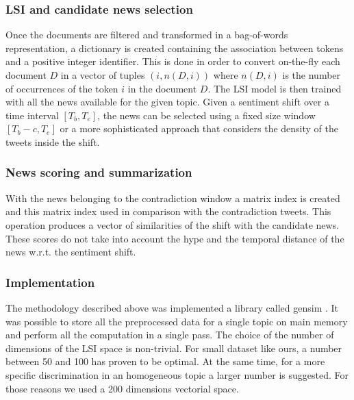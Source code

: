 \subsubsection*{LSI and candidate news selection}
Once the documents are filtered and transformed in a bag-of-words representation, a dictionary is created containing the association between tokens and a positive integer identifier. 
This is done in order to convert on-the-fly each document $D$ in a vector of tuples $(i,n(D,i))$ where $n(D,i)$ is the number of occurrences of the token $i$ in the document $D$. 
The LSI model is then trained with all the news available for the given topic.
Given a sentiment shift over a time interval $[T_b, T_e]$, the news can be selected using a fixed size window $[T_b - c,T_e]$ or a more sophisticated approach that considers the density of the tweets inside the shift.

\subsubsection*{News scoring and summarization}
With the news belonging to the contradiction window a matrix index is created and this matrix index used in comparison with the contradiction tweets.
This operation produces a vector of similarities of the shift with the candidate news.
These scores do not take into account the hype and the temporal distance of the news w.r.t. the sentiment shift.

\subsubsection*{Implementation}
The methodology described above was implemented a library called gensim \cite{Gensim}. 
It was possible to store all the preprocessed data for a single topic on main memory and perform all the computation in a single pass.
The choice of the number of dimensions of the LSI space is non-trivial.
For small dataset like ours, a number between 50 and 100 has proven to be optimal\cite{LSA2}.
At the same time, for a more specific discrimination in an homogeneous topic a larger number is suggested.
For those reasons we used a 200 dimensions vectorial space.
